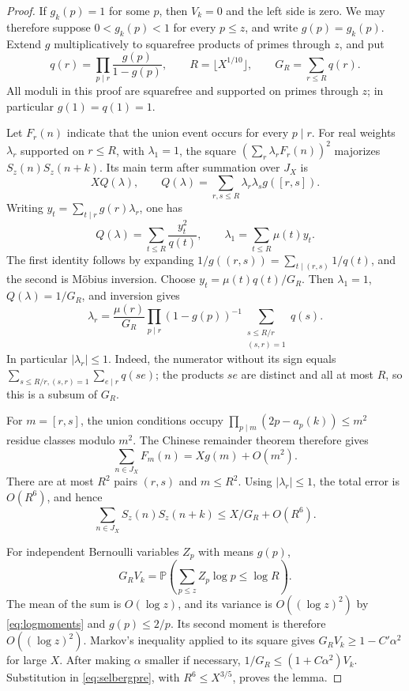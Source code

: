 \documentclass[11pt,reqno]{amsart}
\theoremstyle{remark}
\numberwithin{equation}{section}
\newcommand{\Prob}{\mathbb P}
\begin{document}
\begin{proof}
If $g_k(p)=1$ for some $p$, then $V_k=0$ and the left side is zero.
We may therefore suppose $0<g_k(p)<1$ for every
$p\leq z$, and write $g(p)=g_k(p)$.
Extend $g$ multiplicatively to squarefree products of primes through
$z$, and put
\[
 q(r)=\prod_{p\mid r}\frac{g(p)}{1-g(p)},\qquad
 R=\lfloor X^{1/10}\rfloor,\qquad
 G_R=\sum_{r\leq R}q(r).
\]
All moduli in this proof are squarefree and supported on primes
through $z$; in particular $g(1)=q(1)=1$.

Let $F_r(n)$ indicate that the union event occurs for every $p\mid r$.
For real weights $\lambda_r$ supported on $r\leq R$, with
$\lambda_1=1$, the square
$(\sum_r\lambda_rF_r(n))^2$ majorizes $S_z(n)S_z(n+k)$.
Its main term after summation over $J_X$ is
\[
 XQ(\lambda),\qquad
 Q(\lambda)=\sum_{r,s\leq R}\lambda_r\lambda_sg([r,s]).
\]
Writing $y_t=\sum_{t\mid r}g(r)\lambda_r$, one has
\begin{equation}\label{eq:diagonal}
 Q(\lambda)=\sum_{t\leq R}\frac{y_t^2}{q(t)},
 \qquad \lambda_1=\sum_{t\leq R}\mu(t)y_t.
\end{equation}
The first identity follows by expanding
$1/g((r,s))=\sum_{t\mid(r,s)}1/q(t)$, and the second is
M\"obius inversion.
Choose $y_t=\mu(t)q(t)/G_R$.
Then $\lambda_1=1$, $Q(\lambda)=1/G_R$, and inversion gives
\begin{equation}\label{eq:weights}
 \lambda_r=\frac{\mu(r)}{G_R}
 \prod_{p\mid r}(1-g(p))^{-1}
 \sum_{\substack{s\leq R/r\\(s,r)=1}}q(s).
\end{equation}
In particular $|\lambda_r|\leq1$.
Indeed, the numerator without its sign equals
$\sum_{s\leq R/r,(s,r)=1}\sum_{e\mid r}q(se)$;
the products $se$ are distinct and all at most $R$, so this is a
subsum of $G_R$.

For $m=[r,s]$, the union conditions occupy
$\prod_{p\mid m}(2p-a_p(k))\leq m^2$ residue classes modulo $m^2$.
The Chinese remainder theorem therefore gives
\[
 \sum_{n\in J_X}F_m(n)=Xg(m)+O(m^2).
\]
There are at most $R^2$ pairs $(r,s)$ and $m\leq R^2$.
Using $|\lambda_r|\leq1$, the total error is $O(R^6)$, and hence
\begin{equation}\label{eq:selbergpre}
 \sum_{n\in J_X}S_z(n)S_z(n+k)\leq X/G_R+O(R^6).
\end{equation}

For independent Bernoulli variables $Z_p$ with means $g(p)$,
\[
 G_RV_k=\Prob\left(\sum_{p\leq z}Z_p\log p\leq\log R\right).
\]
The mean of the sum is $O(\log z)$, and its variance is
$O((\log z)^2)$ by \eqref{eq:logmoments} and $g(p)\leq2/p$.
Its second moment is therefore $O((\log z)^2)$.
Markov's inequality applied to its square gives
$G_RV_k\geq1-C'\alpha^2$ for large $X$.
After making $\alpha$ smaller if necessary,
$1/G_R\leq(1+C\alpha^2)V_k$.
Substitution in \eqref{eq:selbergpre}, with $R^6\leq X^{3/5}$,
proves the lemma.
\end{proof}
\end{document}
